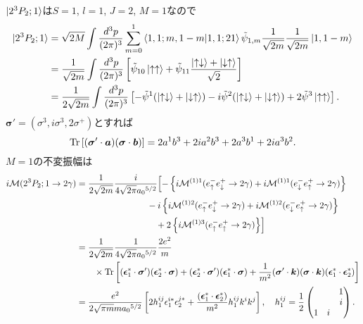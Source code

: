 $\ket{2^3P_2;1}$は$S=1$, $l=1$, $J=2$, $M=1$なので
\begin{align*}
  \ket{2^3P_2;1} &= \sqrt{2M} \int \frac{d^3p}{(2\pi)^3} \sum_{m=0}^1
  \braket{1,1; m,1-m | 1,1; 21} \tilde{\psi}_{1,m} \frac{1}{\sqrt{2m}}\frac{1}{\sqrt{2m}} \ket{1, 1-m} \\
  &= \frac{1}{\sqrt{2m}} \int \frac{d^3p}{(2\pi)^3} \left[ \tilde{\psi}_{10} \ket{\uparrow\uparrow}
  + \tilde{\psi}_{11} \frac{\ket{\uparrow\downarrow} + \ket{\downarrow\uparrow}}{\sqrt{2}} \right] \\
  &= \frac{1}{2\sqrt{2m}} \int \frac{d^3p}{(2\pi)^3} \left[ - \tilde\psi^1 (\ket{\uparrow\downarrow} + \ket{\downarrow\uparrow})
  - i\tilde\psi^2 (\ket{\uparrow\downarrow} + \ket{\downarrow\uparrow}) + 2 \tilde\psi^3 \ket{\uparrow\uparrow} \right] .
\end{align*}
$\boldsymbol\sigma' = (\sigma^3, i\sigma^3, 2\sigma^+)$とすれば
\[ \operatorname{Tr} \left[ (\boldsymbol\sigma' \cdot \boldsymbol{a}) (\boldsymbol\sigma \cdot \boldsymbol{b}) \right] = 2a^1b^3 + 2i a^2b^3 + 2a^3b^1 + 2i a^3b^2 . \]
$M=1$の不変振幅は
\begin{align*}
  i\mathcal{M}(2^3P_2;1 \to 2\gamma) &= \frac{1}{2\sqrt{2m}} \frac{i}{4\sqrt{2\pi} a_0{}^{5/2}}
  \Bigl[ - \left\{ i\mathcal{M}^{(1)1}(e^-_\uparrow e^+_\downarrow \to 2\gamma) + i\mathcal{M}^{(1)1}(e^-_\downarrow e^+_\uparrow \to 2\gamma) \right\} \\
  &\qquad\qquad\qquad\qquad - i \left\{ i\mathcal{M}^{(1)2}(e^-_\uparrow e^+_\downarrow \to 2\gamma) + i\mathcal{M}^{(1)2}(e^-_\downarrow e^+_\uparrow \to 2\gamma) \right\} \\
  &\qquad\qquad\qquad\qquad\quad + 2 \left\{ i\mathcal{M}^{(1)3}(e^-_\uparrow e^+_\uparrow \to 2\gamma) \right\} \Bigr] \\
  &= \frac{1}{2\sqrt{2m}} \frac{1}{4\sqrt{2\pi} a_0{}^{5/2}} \frac{2e^2}{m} \\
  & \qquad \times \operatorname{Tr} \left[ (\boldsymbol{\epsilon}_1^\ast \cdot \boldsymbol\sigma') (\boldsymbol{\epsilon}_2^\ast \cdot \boldsymbol\sigma)
  + (\boldsymbol{\epsilon}_2^\ast \cdot \boldsymbol\sigma')(\boldsymbol{\epsilon}_1^\ast \cdot \boldsymbol\sigma)
  + \frac{1}{m^2} (\boldsymbol\sigma' \cdot \boldsymbol{k})(\boldsymbol\sigma \cdot \boldsymbol{k})(\boldsymbol{\epsilon}_1^\ast \cdot \boldsymbol{\epsilon}_2^\ast) \right] \\
  &= \frac{e^2}{2\sqrt{\pi m}m a_0{}^{5/2}} \left[ 2h_1^{ij} \epsilon_1^{i\ast} \epsilon_2^{j\ast}
  + \frac{(\boldsymbol{\epsilon}_1^\ast \cdot \boldsymbol{\epsilon}_2^\ast)}{m^2} h_1^{ij} k^ik^j \right] , \quad
  h_1^{ij} = \frac{1}{2}
  \begin{pmatrix}
    & & 1 \\
    & & i \\
    1 & i &
  \end{pmatrix}
  .
\end{align*}

